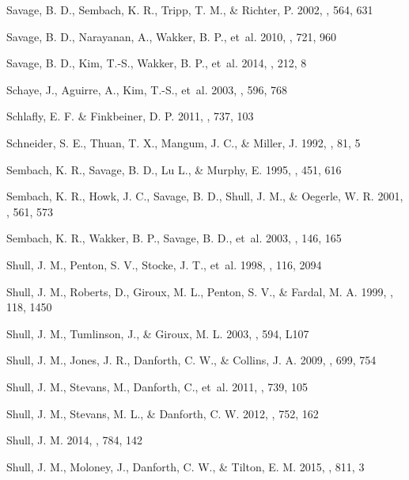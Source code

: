 \documentclass[twocolumn,twocolappendix,tighten,times]{aastex6}
\begin{document}
\begin{thebibliography}
 Savage, B. D., Sembach, K. R., Tripp, T. M., \& Richter, P. 2002, \apj, 564, 631

 Savage, B. D., Narayanan, A., Wakker, B. P., et~al. 2010, \apj, 721, 960

 Savage, B. D., Kim, T.-S., Wakker, B. P., et~al. 2014, \apjs, 212, 8

 Schaye, J., Aguirre, A., Kim, T.-S., et~al. 2003, \apj, 596, 768

 Schlafly, E. F. \& Finkbeiner, D. P. 2011, \apj, 737, 103

 Schneider, S. E., Thuan, T. X., Mangum, J. C., \& Miller, J. 1992, \apjs, 81, 5

 Sembach, K. R., Savage, B. D., Lu L., \& Murphy, E. 1995, \apj, 451, 616

 Sembach, K. R., Howk, J. C., Savage, B. D., Shull, J. M., \& Oegerle, W. R. 2001, \apj, 561, 573

 Sembach, K. R., Wakker, B. P., Savage, B. D., et~al. 2003, \apjs, 146, 165

 Shull, J. M., Penton, S. V., Stocke, J. T., et~al. 1998, \aj, 116, 2094

 Shull, J. M., Roberts, D., Giroux, M. L., Penton, S. V., \& Fardal, M. A. 1999, \aj, 118, 1450

 Shull, J. M., Tumlinson, J., \& Giroux, M. L. 2003, \apj, 594, L107

 Shull, J. M., Jones, J. R., Danforth, C. W., \& Collins, J. A. 2009, \apj, 699, 754

 Shull, J. M., Stevans, M., Danforth, C., et~al. 2011, \apj, 739, 105

 Shull, J. M., Stevans, M. L., \& Danforth, C. W. 2012, \apj, 752, 162

 Shull, J. M. 2014, \apj, 784, 142

 Shull, J. M., Moloney, J., Danforth, C. W., \& Tilton, E. M. 2015, \apj, 811, 3


\end{thebibliography}
\end{document}
